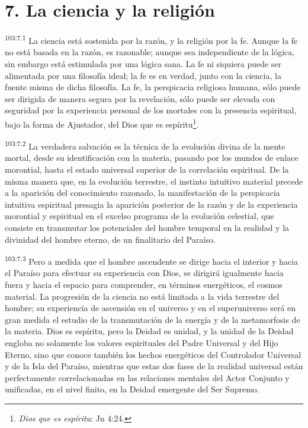 \documentclass[twoside, 11pt]{book}
\begin{document}
\section*{7. La ciencia y la religión}
\par
\textsuperscript{103:7.1} La ciencia está sostenida por la razón, y la religión por la fe. Aunque la fe no está basada en la razón, es razonable; aunque sea independiente de la lógica, sin embargo está estimulada por una lógica sana. La fe ni siquiera puede ser alimentada por una filosofía ideal; la fe es en verdad, junto con la ciencia, la fuente misma de dicha filosofía. La fe, la perspicacia religiosa humana, sólo puede ser dirigida de manera segura por la revelación, sólo puede ser elevada con seguridad por la experiencia personal de los mortales con la presencia espiritual, bajo la forma de Ajustador, del Dios que es espíritu\footnote{\textit{Dios que es espíritu}: Jn 4:24.}.

\par
\textsuperscript{103:7.2} La verdadera salvación es la técnica de la evolución divina de la mente mortal, desde su identificación con la materia, pasando por los mundos de enlace morontial, hasta el estado universal superior de la correlación espiritual. De la misma manera que, en la evolución terrestre, el instinto intuitivo material precede a la aparición del conocimiento razonado, la manifestación de la perspicacia intuitiva espiritual presagia la aparición posterior de la razón y de la experiencia morontial y espiritual en el excelso programa de la evolución celestial, que consiste en transmutar los potenciales del hombre temporal en la realidad y la divinidad del hombre eterno, de un finalitario del Paraíso.

\par
\textsuperscript{103:7.3} Pero a medida que el hombre ascendente se dirige hacia el interior y hacia el Paraíso para efectuar su experiencia con Dios, se dirigirá igualmente hacia fuera y hacia el espacio para comprender, en términos energéticos, el cosmos material. La progresión de la ciencia no está limitada a la vida terrestre del hombre; su experiencia de ascensión en el universo y en el superuniverso será en gran medida el estudio de la transmutación de la energía y de la metamorfosis de la materia. Dios es espíritu, pero la Deidad es unidad, y la unidad de la Deidad engloba no solamente los valores espirituales del Padre Universal y del Hijo Eterno, sino que conoce también los hechos energéticos del Controlador Universal y de la Isla del Paraíso, mientras que estas dos fases de la realidad universal están perfectamente correlacionadas en las relaciones mentales del Actor Conjunto y unificadas, en el nivel finito, en la Deidad emergente del Ser Supremo.
\end{document}
